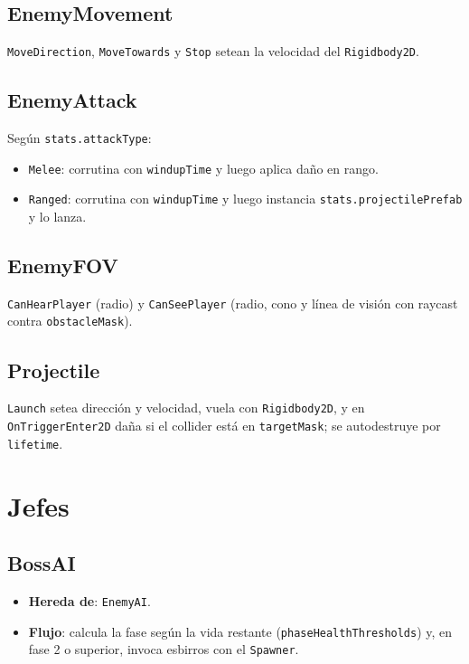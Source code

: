 \documentclass[a4paper,12pt]{article}
\begin{document}
\subsection{EnemyMovement}

\texttt{MoveDirection}, \texttt{MoveTowards} y \texttt{Stop} setean la velocidad del \texttt{Rigidbody2D}.

\subsection{EnemyAttack}

Según \texttt{stats.attackType}:

\begin{itemize}
    \item \texttt{Melee}: corrutina con \texttt{windupTime} y luego aplica daño en rango.
    \item \texttt{Ranged}: corrutina con \texttt{windupTime} y luego instancia \texttt{stats.projectilePrefab} y lo lanza.
\end{itemize}

\subsection{EnemyFOV}

\texttt{CanHearPlayer} (radio) y \texttt{CanSeePlayer} (radio, cono y línea de visión con raycast contra \texttt{obstacleMask}).

\subsection{Projectile}

\texttt{Launch} setea dirección y velocidad, vuela con \texttt{Rigidbody2D}, y en \texttt{OnTriggerEnter2D} daña si el collider está en \texttt{targetMask}; se autodestruye por \texttt{lifetime}.

\section{Jefes}

\subsection{BossAI}

\begin{itemize}
    \item \textbf{Hereda de}: \texttt{EnemyAI}.
    \item \textbf{Flujo}: calcula la fase según la vida restante (\texttt{phaseHealthThresholds}) y, en fase 2 o superior, invoca esbirros con el \texttt{Spawner}.
\end{itemize}
\end{document}
